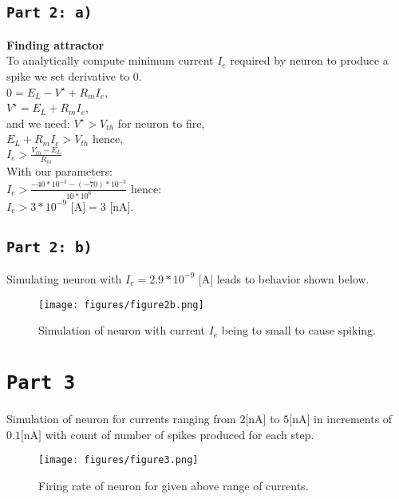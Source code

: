 \documentclass[12pt,a4paper,twocolumn]{article}
\begin{document}
\subsection*{\texttt{Part 2: a)}}
\textbf{\large Finding attractor}\\
To analytically compute minimum current $I_e$ required by neuron to produce a spike we set derivative to 0.\\
$0=E_L-V^{\star} +R_mI_e$,\\
$V^{\star} = E_L + R_mI_e$,\\
and we need: $V^{\star} > V_{th}$ for neuron to fire,\\
$E_L+R_mI_e > V_{th}$ hence,\\
$I_e > \frac{V_{th} - E_L}{R_m}$\\
With our parameters:\\
$I_e > \frac{-40*10^{-3} - (-70)*10^{-3}}{10*10^6}$ hence:\\
$I_e > 3 * 10^{-9}  \text{ [A]} = 3  \text{ [nA]}$.\\

\subsection*{\texttt{Part 2: b)}}
Simulating neuron with $I_e = 2.9 * 10^{-9}  \text{ [A]}$ leads to behavior shown below.\\

\begin{figure}[htbp]
\centering
\texttt{[image: figures/figure2b.png]}
\caption{Simulation of neuron with current $I_e$ being to small to cause spiking.\label{fig:part2b}}
\vspace{0.2cm}
\end{figure}

\section*{\texttt{Part 3}}
Simulation of neuron for currents ranging from $2 \text{[nA]}$ to $5 \text{[nA]}$ in increments of $0.1 \text{[nA]}$ with count of number of spikes produced for each step.\\
\begin{figure}[phtb]
\centering
\texttt{[image: figures/figure3.png]}
\caption{Firing rate of neuron for given above range of currents.\label{fig:part3}}
\vspace{0.2cm}
\end{figure}
\end{document}
